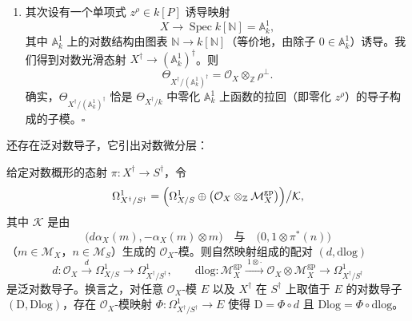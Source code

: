 \begin{examples}
\begin{enumerate}[label=(\arabic*),leftmargin=2.2em,itemsep=3pt]
于是我们看到 $X$ 上对数导子的模为
\[
  \bigoplus_{p\in P} z^p\bigl(N\otimes_{\mathbb{Z}}k\bigr)=k[P]\otimes_{\mathbb{Z}}N.
\]
因此作为层，
\[
  \Theta_{X^{\dagger}/k}=\mathcal{O}_X\otimes_{\mathbb{Z}}N.
\]

\item 其次设有一个单项式 $z^{\rho}\in k[P]$ 诱导映射
\[
  X\longrightarrow\operatorname{Spec} k[\mathbb{N}]=\mathbb{A}^1_k,
\]
其中 $\mathbb{A}^1_k$ 上的对数结构由图表 $\mathbb{N}\to k[\mathbb{N}]$（等价地，由除子 $0\in\mathbb{A}^1_k$）诱导。我们得到对数光滑态射 $X^{\dagger}\to(\mathbb{A}^1_k)^{\dagger}$。则
\[
  \Theta_{X^{\dagger}/(\mathbb{A}^1_k)^{\dagger}}=\mathcal{O}_X\otimes_{\mathbb{Z}}\rho^{\perp}.
\]
确实，$\Theta_{X^{\dagger}/(\mathbb{A}^1_k)^{\dagger}}$ 恰是 $\Theta_{X^{\dagger}/k}$ 中零化 $\mathbb{A}^1_k$ 上函数的拉回（即零化 $z^{\rho}$）的导子构成的子模。\hfill$\square$
\end{enumerate}
\end{examples}

还存在泛对数导子，它引出对数微分层：

\begin{lemma}
给定对数概形的态射 $\pi:X^{\dagger}\to S^{\dagger}$，令
\[
  \Omega^1_{X^{\dagger}/S^{\dagger}}
  =\Bigl(\Omega^1_{X/S}\oplus\bigl(\mathcal{O}_X\otimes_{\mathbb{Z}}\mathcal{M}_X^{\mathrm{gp}}\bigr)\Bigr)\big/\mathcal{K},
\]
其中 $\mathcal{K}$ 是由
\[
  \bigl(d\alpha_X(m),-\alpha_X(m)\otimes m\bigr)
  \quad\text{与}\quad
  \bigl(0,1\otimes\pi^{*}(n)\bigr)
\]
（$m\in\mathcal{M}_X$，$n\in\mathcal{M}_S$）生成的 $\mathcal{O}_X$-模。则自然映射组成的配对 $(d,\mathrm{dlog})$
\[
  d:\mathcal{O}_X\xrightarrow{\ d\ }\Omega^1_{X/S}\longrightarrow\Omega^1_{X^{\dagger}/S^{\dagger}},
  \qquad
  \mathrm{dlog}:\mathcal{M}_X^{\mathrm{gp}}
  \xrightarrow{\ 1\otimes\cdot\ }
  \mathcal{O}_X\otimes\mathcal{M}_X^{\mathrm{gp}}
  \longrightarrow\Omega^1_{X^{\dagger}/S^{\dagger}}
\]
是泛对数导子。换言之，对任意 $\mathcal{O}_X$-模 $E$ 以及 $X^{\dagger}$ 在 $S^{\dagger}$ 上取值于 $E$ 的对数导子 $(\mathrm{D},\mathrm{Dlog})$，存在 $\mathcal{O}_X$-模映射 $\Phi:\Omega^1_{X^{\dagger}/S^{\dagger}}\to E$ 使得 $\mathrm{D}=\Phi\circ d$ 且 $\mathrm{Dlog}=\Phi\circ\mathrm{dlog}$。
\end{lemma}

